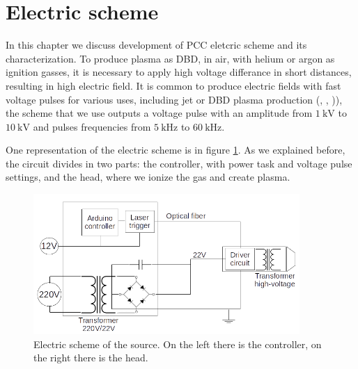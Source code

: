 \section{Electric scheme}
In this chapter we discuss development of PCC eletcric scheme and its characterization. To produce plasma as DBD, in air, with helium or argon as ignition gasses, it is necessary to apply high voltage differance in short distances, resulting in high electric field.
It is common to produce electric fields with fast voltage pulses for various uses, including jet or DBD plasma production (\cite{Upadhyay:hvpulse}, \cite{Jarrige:plumecharacteristics}, \cite{Darny:jetplume})), the scheme that we use outputs a voltage pulse with an amplitude from $\SI{1}{\kilo\volt}$ to $\SI{10}{\kilo\volt}$ and pulses frequencies from $\SI{5}{\kilo\hertz}$ to $\SI{60}{\kilo\hertz}$.

One representation of the electric scheme is in figure \ref{fig:electricline}. As we explained before, the circuit divides in two parts: the controller, with power task and voltage pulse settings, and the head, where we ionize the gas and create plasma.
\begin{figure}
 \centering
 \includegraphics[width=0.9\textwidth]{Images/Electric/Linea_elettrica2.png}
 \caption{Electric scheme of the source. On the left there is the controller, on the right there is the head.}
 \label{fig:electricline}
\end{figure}

